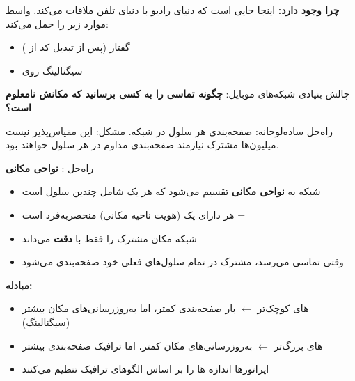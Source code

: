 
\textbf{چرا وجود دارد:} اینجا جایی است که دنیای رادیو با دنیای تلفن ملاقات می‌کند. واسط  موارد زیر را حمل می‌کند:

\begin{itemize}
\tightlist
\item
  گفتار  (پس از تبدیل کد از )
\item
  سیگنالینگ  روی 
\end{itemize}



\CNchained{}

چالش بنیادی شبکه‌های موبایل: \textbf{چگونه تماسی را به کسی برسانید که مکانش نامعلوم است؟}

راه‌حل ساده‌لوحانه: صفحه‌بندی هر سلول در شبکه. مشکل: این مقیاس‌پذیر نیست  میلیون‌ها مشترک نیازمند صفحه‌بندی مداوم در هر سلول خواهند بود.

راه‌حل : \textbf{نواحی مکانی }


\begin{itemize}
\tightlist
\item
  شبکه به \textbf{نواحی مکانی} تقسیم می‌شود که هر یک شامل چندین سلول  است
\item
  هر  دارای یک  (هویت ناحیه مکانی) منحصربه‌فرد است = 
\item
  شبکه مکان مشترک را فقط با \textbf{دقت } می‌داند
\item
  وقتی تماسی می‌رسد، مشترک در تمام سلول‌های  فعلی خود صفحه‌بندی می‌شود
\end{itemize}

\textbf{مبادله:}

\begin{itemize}
\tightlist
\item
  های کوچک‌تر \ensuremath{\leftarrow} بار صفحه‌بندی کمتر، اما به‌روزرسانی‌های مکان بیشتر (سیگنالینگ)
\item
  های بزرگ‌تر \ensuremath{\leftarrow} به‌روزرسانی‌های مکان کمتر، اما ترافیک صفحه‌بندی بیشتر
\item
  اپراتورها اندازه ها را بر اساس الگوهای ترافیک تنظیم می‌کنند
\end{itemize}

